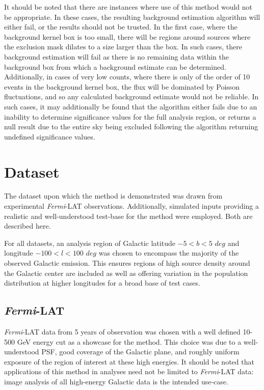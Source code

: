 \documentclass{PoS}
\begin{document}
It should be noted that there are instances where use of this method would not be appropriate. In these cases, the resulting background estimation algorithm will either fail, or the results should not be trusted. In the first case, where the background kernel box is too small, there will be regions around sources where the exclusion mask dilates to a size larger than the box. In such cases, there background estimation will fail as there is no remaining data within the background box from which a background estimate can be determined. Additionally, in cases of very low counts, where there is only of the order of 10 events in the background kernel box, the flux will be dominated by Poisson fluctuations, and so any calculated background estimate would not be reliable. In such cases, it may additionally be found that the algorithm either fails due to an inability to determine significance values for the full analysis region, or returns a null result due to the entire sky being excluded following the algorithm returning undefined significance values.


\section{Dataset}

The dataset upon which the method is demonstrated was drawn from experimental \textit{Fermi}-LAT observations. Additionally, simulated inputs providing a realistic and well-understood test-base for the method were employed. Both are described here.

For all datasets, an analysis region of Galactic latitude $-5 < b < 5$ $deg$ and longitude $-100 < l < 100$ $deg$ was chosen to encompass the majority of the observed Galactic emission. This ensures regions of high source density around the Galactic center are included as well as offering variation in the population distribution at higher longitudes for a broad base of test cases.


\subsection{\textit{Fermi}-LAT}

\textit{Fermi}-LAT data from 5 years of observation was chosen with a well defined 10-500 GeV energy cut as a showcase for the method. This choice was due to a well-understood PSF, good coverage of the Galactic plane, and roughly uniform exposure of the region of interest at these high energies. It should be noted that applications of this method in analyses need not be limited to \textit{Fermi}-LAT data: image analysis of all high-energy Galactic data is the intended use-case.
\end{document}
